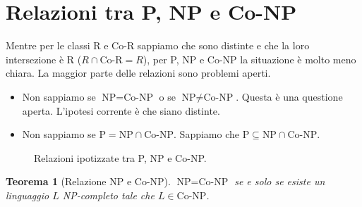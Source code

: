 \documentclass[a4paper, 11pt]{book} %
\newtheorem{theorem}{Teorema}[section]
\theoremstyle{definition}
\begin{document}
\section{Relazioni tra P, NP e Co-NP}

Mentre per le classi R e Co-R sappiamo che sono distinte e che la loro intersezione è R ($R \cap \text{Co-R} = R$), per P, NP e Co-NP la situazione è molto meno chiara. La maggior parte delle relazioni sono problemi aperti.

\begin{itemize}
    \item Non sappiamo se $\text{NP} = \text{Co-NP}$ o se $\text{NP} \neq \text{Co-NP}$. Questa è una questione aperta. L'ipotesi corrente è che siano distinte.
    \item Non sappiamo se $\text{P} = \text{NP} \cap \text{Co-NP}$. Sappiamo che $\text{P} \subseteq \text{NP} \cap \text{Co-NP}$.
\end{itemize}

\begin{figure}[h]
\centering
{}
\caption{Relazioni ipotizzate tra P, NP e Co-NP.}
\end{figure}

\begin{theorem}[Relazione NP e Co-NP]
$\text{NP} = \text{Co-NP}$ se e solo se esiste un linguaggio $L$ NP-completo tale che $L \in \text{Co-NP}$.
\end{theorem}
\end{document}
